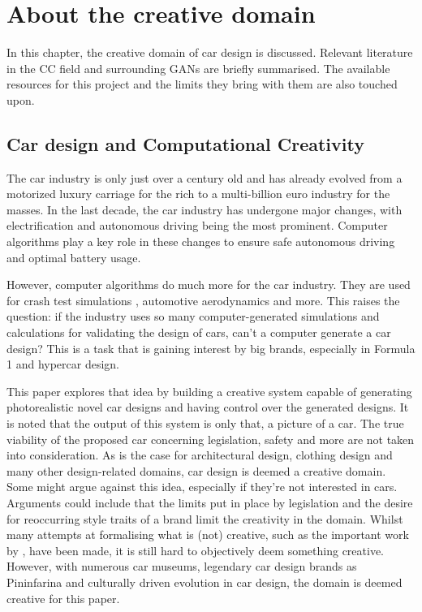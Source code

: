 \chapter{About the creative domain}
\label{ch:creative_domain}


In this chapter, the creative domain of car design is discussed.
Relevant literature in the CC field and surrounding GANs are briefly summarised.
The available resources for this project and the limits they bring with them are also touched upon.

\section{Car design and Computational Creativity}
\label{sec:why_car_design}

The car industry is only just over a century old and has already evolved from a motorized luxury carriage for the rich to a multi-billion euro industry for the masses.
In the last decade, the car industry has undergone major changes, with electrification and autonomous driving being the most prominent.
Computer algorithms play a key role in these changes to ensure safe autonomous driving and optimal battery usage.

However, computer algorithms do much more for the car industry.
They are used for crash test simulations \citep{crashtest}, automotive aerodynamics \citep{carearo} and more.
This raises the question: if the industry uses so many computer-generated simulations and calculations for validating the design of cars, can't a computer generate a car design?
This is a task that is gaining interest by big brands, especially in Formula 1 and hypercar design.

This paper explores that idea by building a creative system capable of generating photorealistic novel car designs and having control over the generated designs.
It is noted that the output of this system is only that, a picture of a car.
The true viability of the proposed car concerning legislation, safety and more are not taken into consideration. 
As is the case for architectural design, clothing design and many other design-related domains, car design is deemed a creative domain.
Some might argue against this idea, especially if they're not interested in cars.
Arguments could include that the limits put in place by legislation and the desire for reoccurring style traits of a brand limit the creativity in the domain.
Whilst many attempts at formalising what is (not) creative, such as the important work by \citet{boden2004creative}, have been made, it is still hard to objectively deem something creative.
However, with numerous car museums, legendary car design brands as Pininfarina and culturally driven evolution in car design, the domain is deemed creative for this paper.




